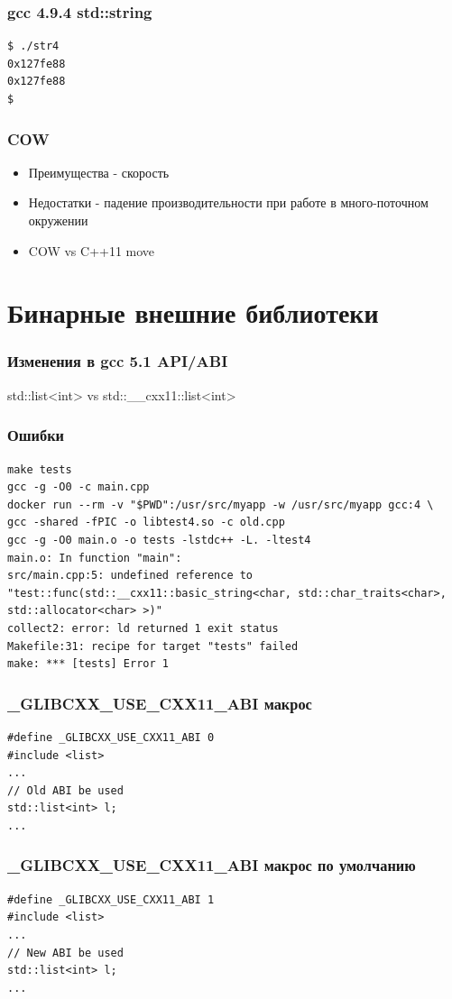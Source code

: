 \documentclass{beamer}
\begin{document}
\begin{frame}[fragile]
\frametitle{gcc 4.9.4 std::string}
\begin{verbatim}
$ ./str4
0x127fe88
0x127fe88
$
\end{verbatim}
\end{frame}


\begin{frame}[fragile]
\frametitle{COW}
\begin{itemize}
\item Преимущества - скорость
\item Недостатки - падение производительности при работе в
  много-поточном окружении
\item COW vs C++11 move
\end{itemize}
\end{frame}


\section{Бинарные внешние библиотеки}

\begin{frame}[fragile]
\frametitle{Изменения в gcc 5.1 API/ABI}
std::list<int> vs 
std::\_\_cxx11::list<int>
\end{frame}

\begin{frame}[fragile]
\frametitle{Ошибки}
\begin{verbatim}
make tests
gcc -g -O0 -c main.cpp 
docker run --rm -v "$PWD":/usr/src/myapp -w /usr/src/myapp gcc:4 \
gcc -shared -fPIC -o libtest4.so -c old.cpp
gcc -g -O0 main.o -o tests -lstdc++ -L. -ltest4
main.o: In function "main":
src/main.cpp:5: undefined reference to 
"test::func(std::__cxx11::basic_string<char, std::char_traits<char>, 
std::allocator<char> >)"
collect2: error: ld returned 1 exit status
Makefile:31: recipe for target "tests" failed
make: *** [tests] Error 1
\end{verbatim}
\end{frame}

\begin{frame}[fragile]
\frametitle{\_GLIBCXX\_USE\_CXX11\_ABI макрос}
\begin{verbatim}
#define _GLIBCXX_USE_CXX11_ABI 0
#include <list>
...
// Old ABI be used
std::list<int> l;
...
\end{verbatim} 
\end{frame}

\begin{frame}[fragile]
\frametitle{\_GLIBCXX\_USE\_CXX11\_ABI макрос по умолчанию}
\begin{verbatim}
#define _GLIBCXX_USE_CXX11_ABI 1
#include <list>
...
// New ABI be used
std::list<int> l;
...
\end{verbatim} 
\end{frame}
\end{document}
